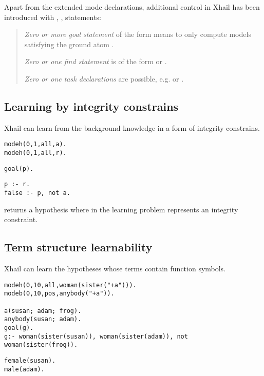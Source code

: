 Apart from the extended mode declarations, additional control in Xhail has been introduced with , ,  statements:

\begin{quote}\cite{ray2007xhail}
\emph{Zero or more goal statement} of the form  means to only compute models satisfying the ground atom .

\emph{Zero or one find statement} is of the form  or .

\emph{Zero or one task declarations} are possible, e.g.  or .
\end{quote}

\subsection{Learning by integrity constrains}
Xhail can learn from the background knowledge in a form of integrity constrains.

\begin{minipage}[t]{.30\textwidth}
\begin{lstlisting}
modeh(0,1,all,a).
modeh(0,1,all,r).
\end{lstlisting}
\end{minipage}
\begin{minipage}[t]{.20\textwidth}
\begin{lstlisting}
goal(p).
\end{lstlisting}
\end{minipage}
\begin{minipage}[t]{.20\textwidth}
\begin{lstlisting}
p :- r.
false :- p, not a.
\end{lstlisting}
\end{minipage}

returns a hypothesis  where in the learning problem
 represents an integrity constraint.

\subsection{Term structure learnability}
Xhail can learn the hypotheses whose terms contain function symbols.

\begin{minipage}[t]{.60\textwidth}
\begin{lstlisting}
modeh(0,10,all,woman(sister("+a"))).
modeb(0,10,pos,anybody("+a")).

a(susan; adam; frog).
anybody(susan; adam).
goal(g).
g:- woman(sister(susan)), woman(sister(adam)), not woman(sister(frog)).
\end{lstlisting}
\end{minipage}
\begin{minipage}[t]{.20\textwidth}
\begin{lstlisting}
female(susan).
male(adam).
\end{lstlisting}
\end{minipage}

